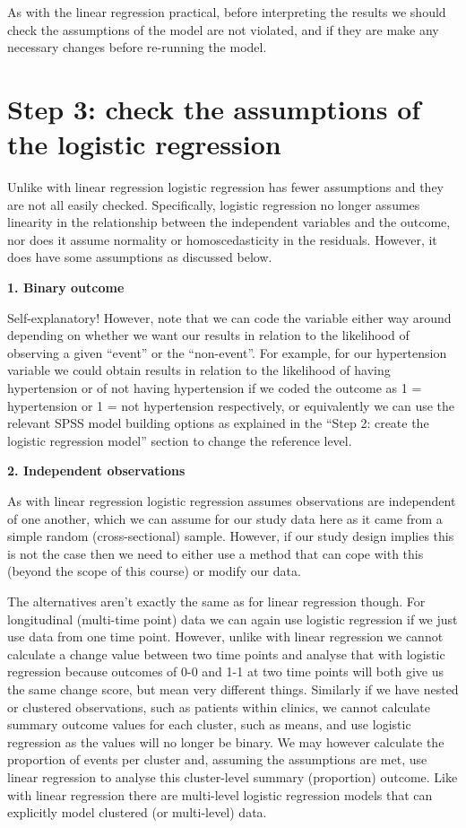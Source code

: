 \documentclass[
]{book}
\begin{document}
As with the linear regression practical, before interpreting the results we should check the assumptions of the model are not violated, and if they are make any necessary changes before re-running the model.

\hypertarget{step-3-check-the-assumptions-of-the-logistic-regression}{%
\section{Step 3: check the assumptions of the logistic regression}\label{step-3-check-the-assumptions-of-the-logistic-regression}}

Unlike with linear regression logistic regression has fewer assumptions and they are not all easily checked. Specifically, logistic regression no longer assumes linearity in the relationship between the independent variables and the outcome, nor does it assume normality or homoscedasticity in the residuals. However, it does have some assumptions as discussed below.

\textbf{1. Binary outcome}

Self-explanatory! However, note that we can code the variable either way around depending on whether we want our results in relation to the likelihood of observing a given ``event'' or the ``non-event''. For example, for our hypertension variable we could obtain results in relation to the likelihood of having hypertension or of not having hypertension if we coded the outcome as 1 = hypertension or 1 = not hypertension respectively, or equivalently we can use the relevant SPSS model building options as explained in the ``Step 2: create the logistic regression model'' section to change the reference level.

\textbf{2. Independent observations}

As with linear regression logistic regression assumes observations are independent of one another, which we can assume for our study data here as it came from a simple random (cross-sectional) sample. However, if our study design implies this is not the case then we need to either use a method that can cope with this (beyond the scope of this course) or modify our data.

The alternatives aren't exactly the same as for linear regression though. For longitudinal (multi-time point) data we can again use logistic regression if we just use data from one time point. However, unlike with linear regression we cannot calculate a change value between two time points and analyse that with logistic regression because outcomes of 0-0 and 1-1 at two time points will both give us the same change score, but mean very different things. Similarly if we have nested or clustered observations, such as patients within clinics, we cannot calculate summary outcome values for each cluster, such as means, and use logistic regression as the values will no longer be binary. We may however calculate the proportion of events per cluster and, assuming the assumptions are met, use linear regression to analyse this cluster-level summary (proportion) outcome. Like with linear regression there are multi-level logistic regression models that can explicitly model clustered (or multi-level) data.
\end{document}
